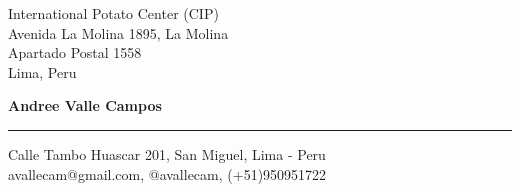 \documentclass{letter} 					%
\begin{document}
\signature{Andree Valle Campos}         %
\longindentation=0pt                    %
\let\raggedleft\raggedright             %
 
 
\begin{letter}{
		International Potato Center (CIP)\\
		Avenida La Molina 1895, La Molina\\
		Apartado Postal 1558\\
		Lima, Peru
		}


\begin{flushleft}
{\large\bf Andree Valle Campos}
\end{flushleft}
\medskip\hrule height 1pt
\begin{flushright}
\hfill Calle Tambo Huascar 201, San Miguel, Lima - Peru \\
\hfill avallecam@gmail.com, @avallecam, (+51)950951722
\end{flushright} 
\vfill %

%


\end{letter}
\end{document}
